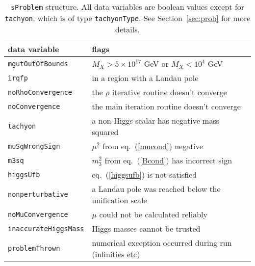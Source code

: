 \documentclass[]{article}
\def\code#1{\small{\tt #1}\normalsize}
\begin{document}
\begin{table}\begin{center}\begin{tabular}{ll} 
data variable & flags \\ \hline
\code{mgutOutOfBounds} & $M_X>5 \times 10^{17}$ GeV or $M_X<10^4$ GeV\\
\code{irqfp} & in a region with a Landau pole \\
\code{noRhoConvergence} & the $\rho$ iterative routine doesn't converge\\
\code{noConvergence} & the main iteration routine doesn't converge \\ 
\code{tachyon} & a non-Higgs scalar has negative mass squared \\
\code{muSqWrongSign} & $\mu^2$ from eq.~(\ref{mucond}) negative \\
\code{m3sq} & $m_3^2$ from eq.~(\ref{Bcond}) has incorrect sign \\
\code{higgsUfb} & eq.~(\ref{higgsufb}) is not satisfied\\
\code{nonperturbative} & a Landau pole was reached below the unification scale
\\
\code{noMuConvergence} & $\mu$ could not be calculated reliably\\
\code{inaccurateHiggsMass} & Higgs masses cannot be trusted\\
\code{problemThrown} & numerical exception occurred during run (infinities etc)\\
\end{tabular}
\caption{\label{table:probs}\code{sProblem} structure. All data variables are boolean values except for
  \code{tachyon}, which is of type \code{tachyonType}. See
  Section~\protect\ref{sec:prob} for more details.}\end{center}\end{table}
\end{document}
